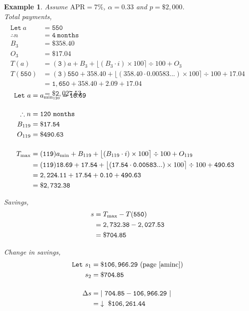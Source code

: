 \documentclass[12pt,letterpaper,oneside]{article}
\newtheorem{example}{Example}[section]
\theoremstyle{remark} %
\begin{document}
	\newpage
	\begin{example}
	Assume $\mbox{APR}=7\%$, $\alpha=0.33$ and $p=\$2,000$.\\[12pt]
	Total payments,
	\begin{align*}
	\\\mathtt{Let\ } a&=\mathtt{550}\\[12pt]
	\therefore n&=\mathtt{4\ months}\\
	B_{3}&=\mathtt{\$358.40}\\
	O_{3}&=\mathtt{\$17.04}\\[12pt]
	T(a)&=(\mathtt{3}) a+B_{3}+\big\lfloor{\left(B_{3}\cdot i\right)\times 100}\big\rceil\div 100+O_{3}\\
	T(\mathtt{550})&=(\mathtt{3}) \mathtt{550}+\mathtt{358.40}+\big\lfloor{\left(\mathtt{358.40}\cdot \mathtt{0.00583...}\right)\times 100}\big\rceil\div 100+\mathtt{17.04}\\
	&=\mathtt{1,650}+\mathtt{358.40}+\mathtt{2.09}+\mathtt{17.04}\\
	&=\mathtt{\$2,027.53}
	\end{align*}

	\label{amind}
	\begin{align*}\\[-36pt]
	\mathtt{Let\ } a&=a_{\rm{min_{120}}}=\mathtt{18.69}\\[12pt]
	\therefore n&=\mathtt{120\ months}\\
	B_{119}&=\mathtt{\$17.54}\\
	O_{119}&=\mathtt{\$490.63}\\[12pt]		
	T_{\rm{max}}&=(\mathtt{119}) a_{\rm{min}}+B_{119}+\big\lfloor{\left(B_{119}\cdot i\right)\times 100}\big\rceil\div 100+O_{119}\\
	&=(\mathtt{119}) \mathtt{18.69}+\mathtt{17.54}+\big\lfloor{\left(\mathtt{17.54}\cdot \mathtt{0.00583...}\right)\times 100}\big\rceil\div 100+\mathtt{490.63}\\
	&=\mathtt{2,224.11}+\mathtt{17.54}+\mathtt{0.10}+\mathtt{490.63}\\
	&=\mathtt{\$2,732.38}
	\end{align*}

	\vspace{12pt}
	Savings,
	\begin{align*}
	s&=T_{\rm{max}}-T(\mathtt{550})\\
	&=\mathtt{2,732.38}-\mathtt{2,027.53}\\
	&=\mathtt{\$704.85}
	\end{align*}
	
	Change in savings,
	\begin{align*}
	\mathtt{Let\ }s_{1}&=\mathtt{\$106,966.29}\ \mbox{(page\ \pageref{aminc})}\\
	s_{2}&=\mathtt{\$704.85}\\[12pt]
	\Delta s&=\left|\ \mathtt{704.85}-\mathtt{106,966.29}\ \right|\\
	&=\mathtt{\downarrow\ \$106,261.44}
	\end{align*}


\end{example}
\end{document}
